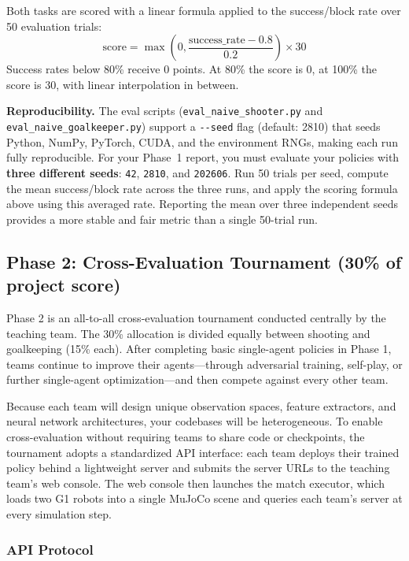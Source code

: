 \documentclass{article}
\begin{document}
Both tasks are scored with a linear formula applied to the success/block rate over 50 evaluation trials:
\[
\text{score} = \max\left(0, \frac{\text{success\_rate} - 0.8}{0.2}\right) \times 30
\]
Success rates below 80\% receive 0 points. At 80\% the score is 0, at 100\% the score is 30, with linear interpolation in between.

\textbf{Reproducibility.} The eval scripts (\texttt{eval\_naive\_shooter.py} and \texttt{eval\_naive\_goalkeeper.py}) support a \texttt{-\/-seed} flag (default: 2810) that seeds Python, NumPy, PyTorch, CUDA, and the environment RNGs, making each run fully reproducible. For your Phase~1 report, you must evaluate your policies with \textbf{three different seeds}: \texttt{42}, \texttt{2810}, and \texttt{202606}. Run 50 trials per seed, compute the mean success/block rate across the three runs, and apply the scoring formula above using this averaged rate. Reporting the mean over three independent seeds provides a more stable and fair metric than a single 50-trial run.

\subsection{Phase 2: Cross-Evaluation Tournament (30\% of project score)}

Phase 2 is an all-to-all cross-evaluation tournament conducted centrally by the teaching team. The 30\% allocation is divided equally between shooting and goalkeeping (15\% each). After completing basic single-agent policies in Phase 1, teams continue to improve their agents---through adversarial training, self-play, or further single-agent optimization---and then compete against every other team.

Because each team will design unique observation spaces, feature extractors, and neural network architectures, your codebases will be heterogeneous. To enable cross-evaluation without requiring teams to share code or checkpoints, the tournament adopts a standardized API interface: each team deploys their trained policy behind a lightweight server and submits the server URLs to the teaching team's web console. The web console then launches the match executor, which loads two G1 robots into a single MuJoCo scene and queries each team's server at every simulation step.

\subsubsection{API Protocol}
\end{document}
